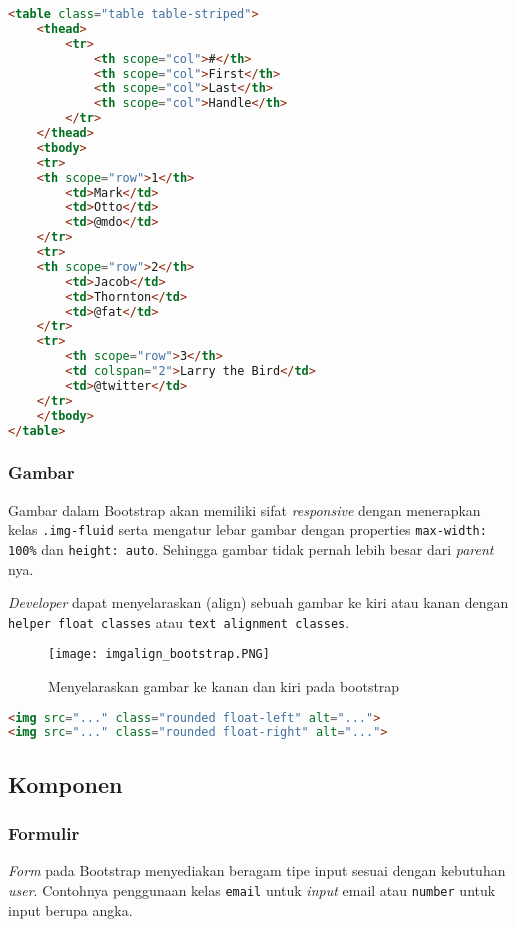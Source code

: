 \begin{itemize}
\begin{lstlisting}[language=HTML, frame=single, basicstyle=\small] 
<table class="table table-striped">
	<thead>
		<tr>
			<th scope="col">#</th>
			<th scope="col">First</th>
			<th scope="col">Last</th>
			<th scope="col">Handle</th>
		</tr>
	</thead>
	<tbody>
	<tr>
	<th scope="row">1</th>
		<td>Mark</td>
		<td>Otto</td>
		<td>@mdo</td>
	</tr>
	<tr>
	<th scope="row">2</th>
		<td>Jacob</td>
		<td>Thornton</td>
		<td>@fat</td>
	</tr>
	<tr>
		<th scope="row">3</th>
		<td colspan="2">Larry the Bird</td>
		<td>@twitter</td>
	</tr>
	</tbody>
</table>
\end{lstlisting}


\subsubsection{Gambar}
Gambar dalam Bootstrap akan memiliki sifat \textit{responsive} dengan menerapkan kelas \texttt{.img-fluid} serta mengatur lebar gambar dengan properties \texttt{max-width: 100\%} dan \texttt{height: auto}. Sehingga gambar tidak pernah lebih besar dari \textit{parent} nya. 

\textit{Developer} dapat menyelaraskan (align) sebuah gambar ke kiri atau kanan dengan \texttt{helper float classes} atau \texttt{text alignment classes}. 
\begin{figure} [H]
	\centering  
	\texttt{[image: imgalign\_bootstrap.PNG]}  
\caption{Menyelaraskan gambar ke kanan dan kiri pada bootstrap} 
\end{figure}
\begin{lstlisting}[language=HTML, frame=single, basicstyle=\small]
<img src="..." class="rounded float-left" alt="...">
<img src="..." class="rounded float-right" alt="...">
\end{lstlisting}



\subsection{Komponen}
\subsubsection{Formulir}
\textit{Form} pada Bootstrap menyediakan beragam tipe input sesuai dengan kebutuhan \textit{user}. Contohnya penggunaan kelas \texttt{email} untuk \textit{input} email atau \texttt{number} untuk input berupa angka.

\end{itemize}
